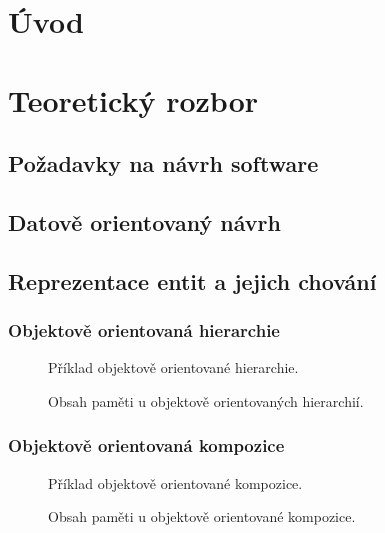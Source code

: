 

\chapter{Úvod}
\blind[1]
\blind[1]
\blind[1]
\blind[1]


\chapter{Teoretický rozbor}
\blind[1]

\section{Požadavky na návrh software}
\blind[2]

\section{Datově orientovaný návrh}
\blind[4]

\section{Reprezentace entit a jejich chování}
\blind[2]

\subsection{Objektově orientovaná hierarchie}
\begin{figure}[H]
	\caption{Příklad objektově orientované hierarchie. }
\end{figure}
\begin{figure}[H]
	\caption{Obsah paměti u objektově orientovaných hierarchií. }
\end{figure}
\blind[3]

\subsection{Objektově orientovaná kompozice}
\begin{figure}[H]
	\caption{Příklad objektově orientované kompozice. }
\end{figure}
\begin{figure}[H]
	\caption{Obsah paměti u objektově orientované kompozice. }
\end{figure}
\blind[3]

